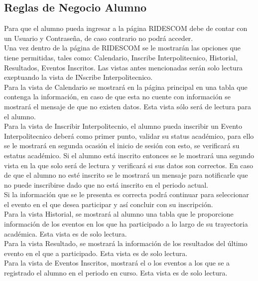 \subsection{Reglas de Negocio Alumno}
Para que el alumno pueda ingresar a la página RIDESCOM debe de contar con un Usuario y Contraseña, de caso contrario no podrá acceder.\\

Una vez dentro de la página de RIDESCOM se le mostrarán las opciones que tiene permitidas, tales como: Calendario, Inscribe Interpolitecnico, Historial,  Resultados, Eventos Inscritos. Las vistas antes mencionadas serán solo lectura exeptuando la vista de INscribe Interpolitecnico.\\

Para la vista de Calendario se mostrará en la página principal en una tabla que contenga la información, en caso de que esta no cuente con información se mostrará el mensaje de que no existen datos. Esta vista sólo será de lectura para el alumno.\\

Para la vista de Inscribir Interpolitecnio, el alumno pueda inscribir un Evento Interpolitecnico deberá como primer punto, validar su status académico, para ello se le mostrará en segunda ocasión el inicio de sesión con esto, se verificará su estatus académico. Si el alumno está inscrito entonces se le mostrará una segundo vista en la que solo será de lectura y verificará si sus datos son correctos. En caso de que el alumno no esté inscrito se le mostrará un mensaje para notificarle que no puede inscribirse dado que no está inscrito en el periodo actual. \\
Si la información que se le presenta es correcta podrá continuar para seleccionar el evento en el que desea participar y así concluir con su inscripción. \\

Para la vista Historial, se mostrará al alumno una tabla que le proporcione información de los eventos en los que ha participado a lo largo de su trayectoria académica. Esta vista es de solo lectura.\\

Para la vista Resultado, se mostrará la información de los resultados del último evento en el que a participado. Esta vista es de solo lectura.\\

Para la vista de Eventos Inscritos, mostrará el o los eventos a los que se a registrado el alumno en el periodo en curso. Esta vista es de solo lectura.\\


